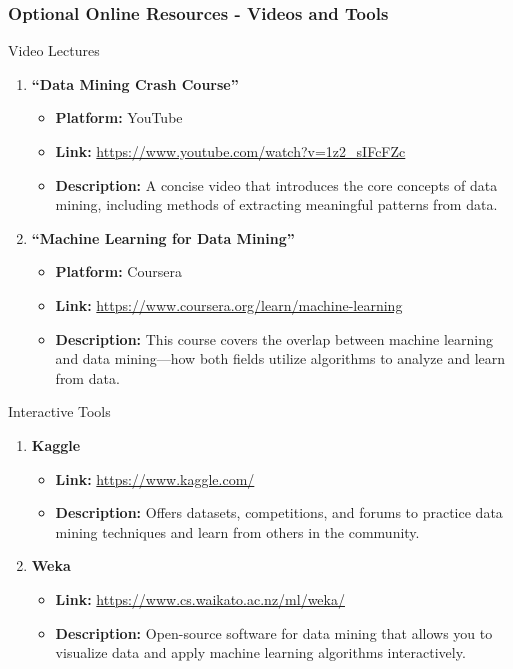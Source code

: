 \documentclass[aspectratio=169]{beamer}
\begin{document}
\begin{frame}[fragile]
\frametitle{Optional Online Resources - Videos and Tools}
\begin{block}{Video Lectures}
\begin{enumerate}
    \item \textbf{“Data Mining Crash Course”}
    \begin{itemize}
        \item \textbf{Platform:} YouTube
        \item \textbf{Link:} \url{https://www.youtube.com/watch?v=1z2_sIFcFZc}
        \item \textbf{Description:} A concise video that introduces the core concepts of data mining, including methods of extracting meaningful patterns from data.
    \end{itemize}

    \item \textbf{“Machine Learning for Data Mining”}
    \begin{itemize}
        \item \textbf{Platform:} Coursera
        \item \textbf{Link:} \url{https://www.coursera.org/learn/machine-learning}
        \item \textbf{Description:} This course covers the overlap between machine learning and data mining—how both fields utilize algorithms to analyze and learn from data.
    \end{itemize}
\end{enumerate}
\end{block}

\begin{block}{Interactive Tools}
\begin{enumerate}
    \item \textbf{Kaggle}
    \begin{itemize}
        \item \textbf{Link:} \url{https://www.kaggle.com/}
        \item \textbf{Description:} Offers datasets, competitions, and forums to practice data mining techniques and learn from others in the community.
    \end{itemize}

    \item \textbf{Weka}
    \begin{itemize}
        \item \textbf{Link:} \url{https://www.cs.waikato.ac.nz/ml/weka/}
        \item \textbf{Description:} Open-source software for data mining that allows you to visualize data and apply machine learning algorithms interactively.
    \end{itemize}
\end{enumerate}
\end{block}
\end{frame}
\end{document}
